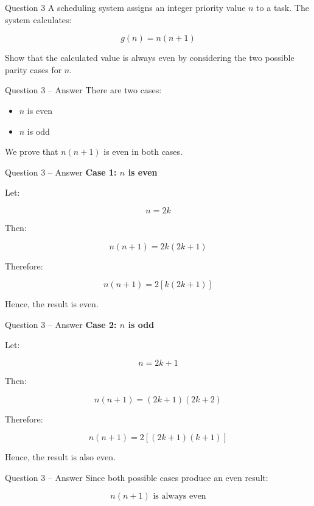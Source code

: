 
\begin{frame}{Question 3}
A scheduling system assigns an integer priority value $n$ to a task.
The system calculates:

$$
g(n)=n(n+1)
$$

Show that the calculated value is always even by considering the two
possible parity cases for $n$.
\end{frame}

\begin{frame}{Question 3 -- Answer}
There are two cases:

\begin{itemize}
\item $n$ is even
\item $n$ is odd
\end{itemize}

We prove that $n(n+1)$ is even in both cases.
\end{frame}

\begin{frame}{Question 3 -- Answer}
\textbf{Case 1: $n$ is even}

Let:

$$
n=2k
$$

Then:

$$
n(n+1)=2k(2k+1)
$$

Therefore:

$$
n(n+1)=2[k(2k+1)]
$$

Hence, the result is even.
\end{frame}

\begin{frame}{Question 3 -- Answer}
\textbf{Case 2: $n$ is odd}

Let:

$$
n=2k+1
$$

Then:

$$
n(n+1)=(2k+1)(2k+2)
$$

Therefore:

$$
n(n+1)=2[(2k+1)(k+1)]
$$

Hence, the result is also even.
\end{frame}

\begin{frame}{Question 3 -- Answer}
Since both possible cases produce an even result:

$$
\boxed{n(n+1)\text{ is always even}}
$$

\end{frame}

